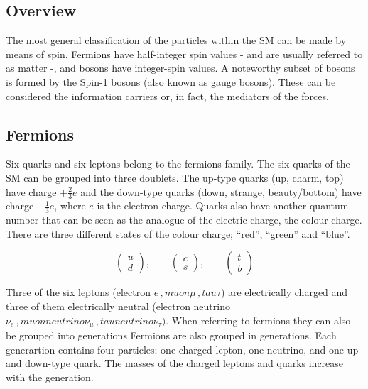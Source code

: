 		\subsection{Overview}
		\label{sec:SMov}

			The most general classification of the particles within the SM can be made by means of spin. Fermions have half-integer spin values - and are usually referred to as matter -, and bosons have integer-spin values. A noteworthy subset of bosons is formed by the Spin-1 bosons (also known as gauge bosons). These can be considered the information carriers or, in fact, the mediators of the forces. 


			\subsection*{Fermions}

				Six quarks and six leptons belong to the fermions family. The six quarks of the SM can be grouped into three doublets. The up-type quarks (up, charm, top) have charge $+\frac{2}{3}e$ and the down-type quarks (down, strange, beauty/bottom) have charge $-\frac{1}{3}e$, where $e$ is the electron charge. Quarks also have another quantum number that can be seen as the analogue of the electric charge, the colour charge. There are three different states of the colour charge; ``red'', ``green'' and ``blue''.

				\begin{equation*}
				\label{eqn:quark_doublets}
					\begin{pmatrix} u \\ d \end{pmatrix}, \qquad 
					\begin{pmatrix} c \\ s \end{pmatrix}, \qquad 
					\begin{pmatrix} t \\ b \end{pmatrix}
				\end{equation*}

				Three of the six leptons (electron $e\,,muon \mu\,, tau \tau$) are electrically charged and three of them electrically neutral (electron neutrino $\nu_e\,, muon neutrino \nu_{\mu}\,, tau neutrino \nu_{\tau})$. When referring to fermions they can also be grouped into generations
				Fermions are also grouped in generations. Each generartion contains four particles; one charged lepton, one neutrino, and one up- and down-type quark. The masses of the charged leptons and quarks increase with the generation. 

